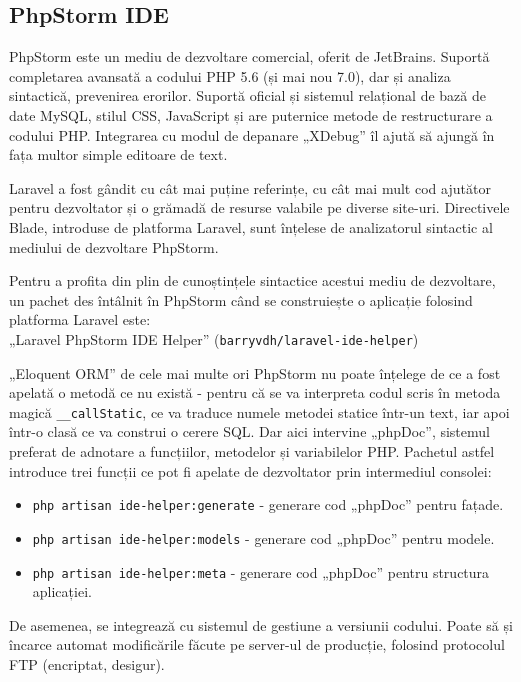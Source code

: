 	\subsection{PhpStorm IDE}

		PhpStorm este un mediu de dezvoltare comercial, oferit de JetBrains.
		Suportă completarea avansată a codului PHP 5.6 (și mai nou 7.0), dar și analiza sintactică, prevenirea erorilor.
		Suportă oficial și sistemul relațional de bază de date MySQL, stilul CSS, JavaScript și are puternice metode de restructurare a codului PHP.
		Integrarea cu modul de depanare „XDebug” îl ajută să ajungă în fața multor simple editoare de text.

		Laravel a fost gândit cu cât mai puține referințe, cu cât mai mult cod ajutător pentru dezvoltator și o grămadă de resurse valabile pe diverse site-uri.
		Directivele Blade, introduse de platforma Laravel, sunt înțelese de analizatorul sintactic al mediului de dezvoltare PhpStorm.

		Pentru a profita din plin de cunoștințele sintactice acestui mediu de dezvoltare, un pachet des întâlnit în PhpStorm când se construiește o aplicație folosind platforma Laravel este: \\
		„Laravel PhpStorm IDE Helper” (\verb|barryvdh/laravel-ide-helper|)

		„Eloquent ORM” de cele mai multe ori PhpStorm nu poate înțelege de ce a fost apelată o metodă ce nu există - pentru că se va interpreta codul scris în metoda magică \verb|__callStatic|, ce va traduce numele metodei statice într-un text, iar apoi într-o clasă ce va construi o cerere SQL.
		Dar aici intervine „phpDoc”, sistemul preferat de adnotare a funcțiilor, metodelor și variabilelor PHP.
		Pachetul astfel introduce trei funcții ce pot fi apelate de dezvoltator prin intermediul consolei:
			\begin{itemize}
				\item
				\verb|php artisan ide-helper:generate| - generare cod „phpDoc” pentru fațade.
				\item
				\verb|php artisan ide-helper:models| - generare cod „phpDoc” pentru modele.
				\item
				\verb|php artisan ide-helper:meta| - generare cod „phpDoc” pentru structura aplicației.
			\end{itemize}

		De asemenea, se integrează cu sistemul de gestiune a versiunii codului.
		Poate să și încarce automat modificările făcute pe server-ul de producție, folosind protocolul FTP (encriptat, desigur).

